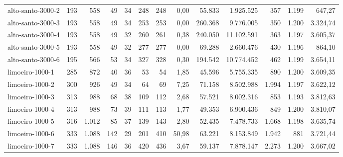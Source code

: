 \begin{table}[ht!]
{\begin{tabular}{lrrrrrrrrrrrr}
			\rowcolor{rowgrey}alto-santo-3000-2                                                       & 193 & 558   & 49  & 34 & 248 & 248 & 0,00  & 55.833  & 1.925.525  & 357   & 1.199 & 647,27   \\
			\rowcolor{rowgrey}alto-santo-3000-3                                                       & 193 & 558   & 49  & 34 & 253 & 253 & 0,00  & 260.368 & 9.776.005  & 350   & 1.200 & 3.324,74 \\
			\rowcolor{rowlight}alto-santo-3000-4                                                      & 193 & 558   & 49  & 32 & 260 & 261 & 0,38  & 240.050 & 11.102.591 & 363   & 1.197 & 3.605,37 \\
			\rowcolor{rowgrey}alto-santo-3000-5                                                       & 193 & 558   & 49  & 32 & 277 & 277 & 0,00  & 69.288  & 2.660.476  & 430   & 1.196 & 864,10   \\
			\rowcolor{rowlight}alto-santo-3000-6                                                      & 195 & 566   & 53  & 34 & 327 & 328 & 0,30  & 194.542 & 10.774.452 & 462   & 1.199 & 3.654,11 \\
			\midrule
			\rowcolor{rowlight}limoeiro-1000-1                                                        & 285 & 872   & 40  & 36 & 53  & 54  & 1,85  & 45.596  & 5.755.335  & 890   & 1.200 & 3.609,35 \\
			\rowcolor{rowlight}limoeiro-1000-2                                                        & 300 & 926   & 49  & 34 & 64  & 69  & 7,25  & 71.158  & 8.502.988  & 1.994 & 1.197 & 3.622,12 \\
			\rowcolor{rowlight}limoeiro-1000-3                                                        & 313 & 988   & 68  & 38 & 109 & 112 & 2,68  & 57.521  & 8.002.316  & 853   & 1.193 & 3.812,63 \\
			\rowcolor{rowlight}limoeiro-1000-4                                                        & 313 & 988   & 73  & 39 & 111 & 113 & 1,77  & 49.353  & 6.900.436  & 849   & 1.200 & 3.810,07 \\
			\rowcolor{rowlight}limoeiro-1000-5                                                        & 316 & 1.012 & 85  & 37 & 139 & 143 & 2,80  & 52.435  & 7.478.733  & 1.668 & 1.198 & 3.635,74 \\
			\rowcolor{rowlight}limoeiro-1000-6                                                        & 333 & 1.088 & 142 & 29 & 201 & 410 & 50,98 & 63.221  & 8.153.849  & 1.942 & 881   & 3.721,44 \\
			\rowcolor{rowlight}limoeiro-1000-7                                                        & 333 & 1.088 & 146 & 36 & 420 & 436 & 3,67  & 59.137  & 7.878.147  & 2.273 & 1.200 & 3.667,02 \\

\end{tabular}}
\end{table}
